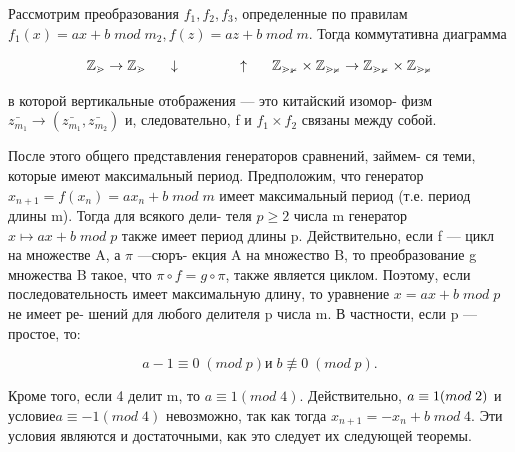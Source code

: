 \documentclass{../template/mai_book}
\begin{document}
\begin{myproof}
Рассмотрим преобразования $f_{1}, f_{2}, f_{3}$, определенные по правилам \linebreak \indent $f_{1}(x) = ax + b \; mod \; m_{2}, f(z) = az + b \; mod \; m.$ \linebreak \indent Тогда коммутативна диаграмма \par 

$$\mathbb{Z_{m}} \to \mathbb{Z_{m}} \linebreak \indent
 \downarrow \;\;\;\;\;\;\;\;\;\;\;\;\;\;\;\; \uparrow \linebreak \indent
 \mathbb{Z_{m_{1}}} \times \mathbb{Z_{m_{2}}} \to \mathbb{Z_{m_{1}}} \times \mathbb{Z_{m_{2}}}$$ \par 
 в которой вертикальные отображения --- это китайский изомор- \linebreak \indent физм $\bar{z_{m_{1}}} \to (\bar{z_{m_{1}}}, \bar{z_{m_{2}}})$ и, следовательно, f и $f_{1} \times f_{2}$ связаны между \linebreak \indent собой. \end{myproof}
 \newpage
 
 
После этого общего представления генераторов сравнений, займем-  \linebreak ся теми, которые имеют максимальный период. \linebreak 
\indent Предположим, что генератор $x_{n+1} = f(x_{n}) = ax_{n} + b \; mod \; m$ имеет \linebreak максимальный период (т.е. период длины m). Тогда для всякого дели- \linebreak теля $p \geqslant 2$ числа m генератор $x \mapsto ax + b \; mod \; p$ также имеет период \linebreak длины p. Действительно, если f --- цикл на множестве A, а $\pi$ ---сюръ- \linebreak екция A на множество B, то преобразование g множества B такое, что \linebreak $\pi \circ f = g \circ \pi$, также является циклом. Поэтому, если последовательность \linebreak имеет максимальную длину, то уравнение $x = ax + b \; mod \; p$ не имеет ре- \linebreak шений для любого делителя p числа m. В частности, если p --- простое, \linebreak то: \par
$$a - 1 \equiv 0 \; (mod \; p) и\; b \not\equiv 0 \; (mod \; p).$$ \par 
\noindent Кроме того, если 4 делит m, то $a \equiv 1 (mod \; 4)$. Действительно, $a \equiv 1 \linebreak (mod \; 2)$  и условие$ a \equiv -1 (mod \; 4)$ невозможно, так как тогда \linebreak $x_{n+1} = -x_{n} + b \; mod \; 4$. Эти условия являются и \linebreak достаточными, как это следует их следующей теоремы. \par 
\end{document}
